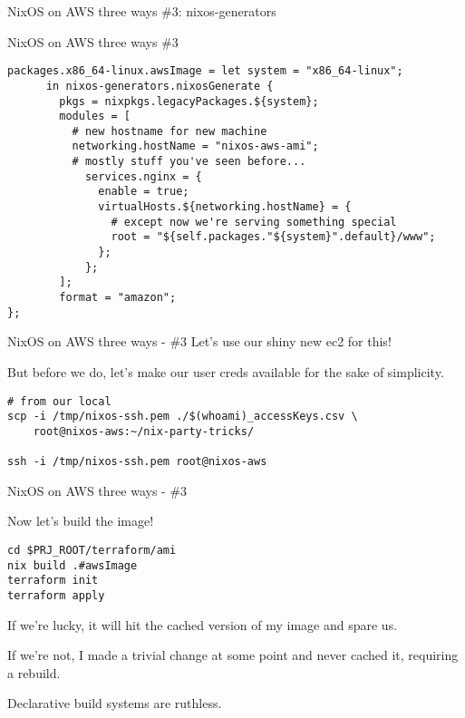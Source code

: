 \documentclass[bigger]{beamer}
\begin{document}
\begin{frame}[label={sec:org7f7b947}]{NixOS on AWS three ways}
\#3: nixos-generators
\end{frame}
\begin{frame}[label={sec:orgdf9da33},fragile]{NixOS on AWS three ways \#3}
 \tiny
\begin{verbatim}
packages.x86_64-linux.awsImage = let system = "x86_64-linux";
      in nixos-generators.nixosGenerate {
        pkgs = nixpkgs.legacyPackages.${system};
        modules = [
          # new hostname for new machine
          networking.hostName = "nixos-aws-ami";
          # mostly stuff you've seen before...
            services.nginx = {
              enable = true;
              virtualHosts.${networking.hostName} = {
                # except now we're serving something special
                root = "${self.packages."${system}".default}/www";
              };
            };
        ];
        format = "amazon";
};
\end{verbatim}
\end{frame}
\begin{frame}[label={sec:orgdb008cd},fragile]{NixOS on AWS three ways - \#3}
 Let's use our shiny new ec2  for this!

\begin{exampleblock}{But before we do, let's make our user creds available for the sake of simplicity.}
\tiny
\begin{verbatim}
# from our local
scp -i /tmp/nixos-ssh.pem ./$(whoami)_accessKeys.csv \
    root@nixos-aws:~/nix-party-tricks/

ssh -i /tmp/nixos-ssh.pem root@nixos-aws
\end{verbatim}
\end{exampleblock}
\end{frame}
\begin{frame}[label={sec:org860397a},fragile]{NixOS on AWS three ways - \#3}
 \begin{exampleblock}{Now let's build the image!}
\begin{verbatim}
cd $PRJ_ROOT/terraform/ami
nix build .#awsImage
terraform init
terraform apply
\end{verbatim}

If we're lucky, it will hit the cached version of my image and spare us.

If we're not, I made a trivial change at some point and never cached it, requiring a rebuild.

Declarative build systems are ruthless.
\end{exampleblock}
\end{frame}
\end{document}

